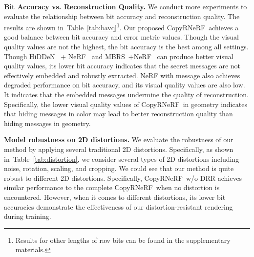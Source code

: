 \documentclass[10pt,twocolumn,letterpaper]{article}
\newcommand{\Tref}[1]{Table~\ref{#1}}
\newcommand{\Sref}[1]{Section~\ref{#1}}
\def\CopyNeRF{CopyRNeRF~}
\begin{document}
\noindent\textbf{Bit Accuracy vs. Reconstruction Quality.}
 We conduct more experiments to evaluate the relationship between bit accuracy and reconstruction quality. The results are shown in~\Tref{tab:bavq}\footnote{Results for other lengths of raw bits can be found in the supplementary materials.}. Our proposed \CopyNeRF achieves a good balance between bit accuracy and error metric values. Though the visual quality values are not the highest, the bit accuracy is the best among all settings. Though HiDDeN~\cite{zhu2018hidden} + NeRF~\cite{nerf2020} and MBRS~\cite{jia2021mbrs}+NeRF~\cite{nerf2020} can produce better visual quality values, its lower bit accuracy indicates that the secret messages are not effectively embedded and robustly extracted. NeRF with message also achieves degraded performance on bit accuracy, and its visual quality values are also low. It indicates that the embedded messages undermine the quality of reconstruction. Specifically, the lower visual quality values of \CopyNeRF in geometry indicates that hiding messages in color may lead to better reconstruction quality than hiding messages in geometry.







\noindent\textbf{Model robustness on 2D distortions.}
We evaluate the robustness of our method by applying several traditional 2D distortions. Specifically, as shown in~\Tref{tab:distortion}, we consider several types of 2D distortions including noise, rotation, scaling, and cropping. We could see that our method is quite robust to different 2D distortions. Specifically, \CopyNeRF w/o DRR achieves similar performance to the complete \CopyNeRF when no distortion is encountered. However, when it comes to different distortions, its lower bit accuracies demonstrate the effectiveness of our distortion-resistant rendering during training.
\end{document}
